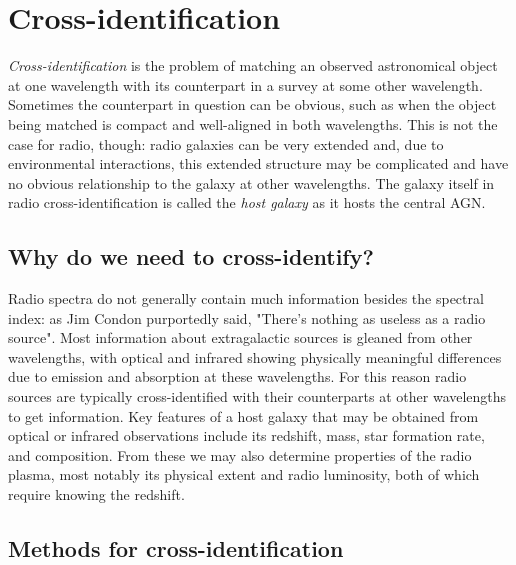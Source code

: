\documentclass[11pt, a4paper]{book}
\newcommand{\defn}[1]{\emph{#1}}
\begin{document}
\section{Cross-identification}
\label{sec:xid}

    \defn{Cross-identification} is the problem of matching an observed astronomical object at one wavelength with its counterpart in a survey at some other wavelength. Sometimes the counterpart in question can be obvious, such as when the object being matched is compact and well-aligned in both wavelengths. This is not the case for radio, though: radio galaxies can be very extended and, due to environmental interactions, this extended structure may be complicated and have no obvious relationship to the galaxy at other wavelengths. The galaxy itself in radio cross-identification is called the \defn{host galaxy} as it hosts the central AGN.

    \subsection{Why do we need to cross-identify?}
    \label{sec:xid-why}

        Radio spectra do not generally contain much information besides the spectral index: as Jim Condon purportedly said, "There's nothing as useless as a radio source". Most information about extragalactic sources is gleaned from other wavelengths, with optical and infrared showing physically meaningful differences due to emission and absorption at these wavelengths. For this reason radio sources are typically cross-identified with their counterparts at other wavelengths to get information. Key features of a host galaxy that may be obtained from optical or infrared observations include its redshift, mass, star formation rate, and composition. From these we may also determine properties of the radio plasma, most notably its physical extent and radio luminosity, both of which require knowing the redshift.

    \subsection{Methods for cross-identification}
    \label{sec:xid-how}
\end{document}
